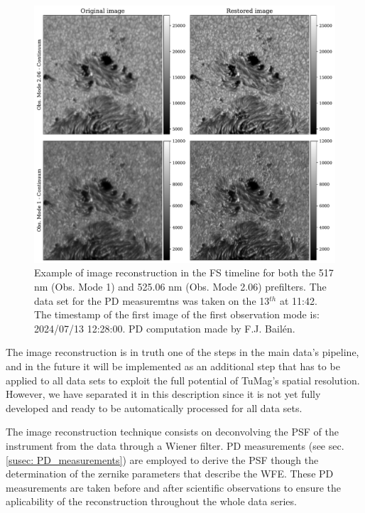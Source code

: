 \begin{figure}[h]
  \begin{minipage}[c]{0.67\textwidth}
    \includegraphics[width=\textwidth]{figures/Pipeline/Image_restoration.pdf}
  \end{minipage}\hfill
  \begin{minipage}[c]{0.29\textwidth}
    \caption{
     Example of image reconstruction in the FS timeline for both the 517 nm (Obs. Mode 1) and 525.06 nm (Obs. Mode 2.06) prefilters. The data set for the PD measuremtns was taken on the 13$^{th}$ at 11:42. The timestamp of the first image of the first observation mode is: 2024/07/13 12:28:00. PD computation made by F.J. Bailén.
     \label{fig_pipeline:  image_restoration}} 
  \end{minipage}
\end{figure}

The image reconstruction is in truth one of the steps in the main data's pipeline, and in the future it will be implemented as an additional step that has to be applied to all data sets to exploit the full potential of TuMag's spatial resolution. However, we have separated it in this description since it is not yet fully developed and ready to be automatically processed for all data sets. 

The image reconstruction technique consists on deconvolving the PSF of the instrument from the data through a Wiener filter. PD measurements (see sec. \ref{susec: PD_measurements}) are employed to derive the PSF though the determination of the zernike parameters that describe the WFE. These PD measurements are taken before and after scientific observations to ensure the aplicability of the reconstruction throughout the whole data series.

